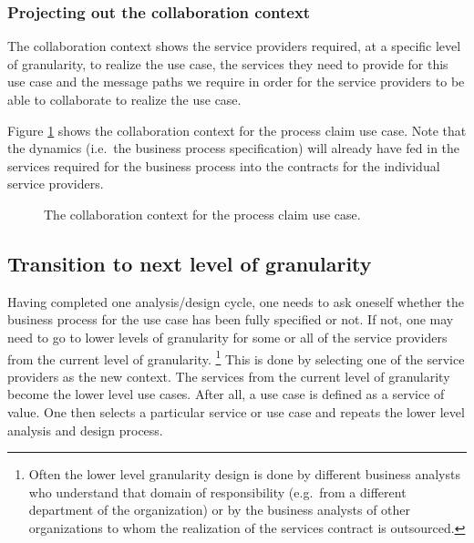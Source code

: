 \documentclass{IOS-Book-Article}
\begin{document}
\subsubsection{Projecting out the collaboration context}

The collaboration context shows the service providers required, at a specific level of granularity, to realize
the use case, the services they need to provide for this use case and the message paths we require in order
for the service providers to be able to collaborate to realize the use case.

Figure \ref{fig:processClaimCollaborationContext} shows the collaboration context for the process claim use case.
Note that the dynamics (i.e.\ the business process specification) will already have fed in the services required for
the business process into the contracts for the individual service providers. 

\begin{figure}[htb]
  \centering
  \caption{The collaboration context for the process claim use case.}
  \label{fig:processClaimCollaborationContext}
\end{figure}


\subsection{Transition to next level of granularity}

Having completed one analysis/design cycle, one needs to ask oneself whether
the business process for the use case has been fully specified or not. If not, one
may need to go to lower levels of granularity for some or all of the service
providers from the current level of granularity. \footnote{Often the lower level
granularity design is done by different business analysts who understand that domain
of responsibility (e.g.\ from a different department of the organization) or by the
business analysts of other organizations to whom the realization of the services 
contract is outsourced.}
This is done by selecting one of the service providers as the new context. The services
from the current level of granularity become the lower level use cases. After all, a use case
is defined as a service of value\cite{rumbaugh:umlReference}. One then selects a particular
service or use case and repeats the lower level analysis and design process.
\end{document}
